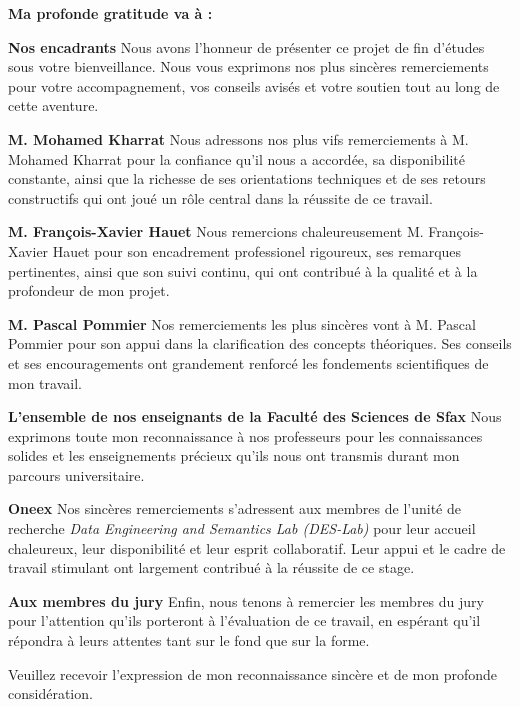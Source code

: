 \textbf{Ma profonde gratitude va à :}

\medskip

\textbf{Nos encadrants}  
Nous avons l’honneur de présenter ce projet de fin d’études sous votre bienveillance. Nous vous exprimons nos plus sincères remerciements pour votre accompagnement, vos conseils avisés et votre soutien tout au long de cette aventure.

\medskip

\textbf{M. Mohamed Kharrat}  
Nous adressons nos plus vifs remerciements à M. Mohamed Kharrat pour la confiance qu’il nous a accordée, sa disponibilité constante, ainsi que la richesse de ses orientations techniques et de ses retours constructifs qui ont joué un rôle central dans la réussite de ce travail.

\medskip

\textbf{M. François-Xavier Hauet}  
Nous remercions chaleureusement M. François-Xavier Hauet pour son encadrement professionel rigoureux, ses remarques pertinentes, ainsi que son suivi continu, qui ont contribué à la qualité et à la profondeur de mon projet.

\medskip

\textbf{M. Pascal Pommier}  
Nos remerciements les plus sincères vont à M. Pascal Pommier pour son appui dans la clarification des concepts théoriques. Ses conseils et ses encouragements ont grandement renforcé les fondements scientifiques de mon travail.

\medskip

\textbf{L’ensemble de nos enseignants de la Faculté des Sciences de Sfax}  
Nous exprimons toute mon reconnaissance à nos professeurs pour les connaissances solides et les enseignements précieux qu’ils nous ont transmis durant mon parcours universitaire.

\medskip

\textbf{Oneex}  
Nos sincères remerciements s’adressent aux membres de l’unité de recherche \textit{Data Engineering and Semantics Lab (DES-Lab)} pour leur accueil chaleureux, leur disponibilité et leur esprit collaboratif. Leur appui et le cadre de travail stimulant ont largement contribué à la réussite de ce stage.

\medskip

\textbf{Aux membres du jury}  
Enfin, nous tenons à remercier les membres du jury pour l’attention qu’ils porteront à l’évaluation de ce travail, en espérant qu’il répondra à leurs attentes tant sur le fond que sur la forme.

Veuillez recevoir l’expression de mon reconnaissance sincère et de mon profonde considération.
